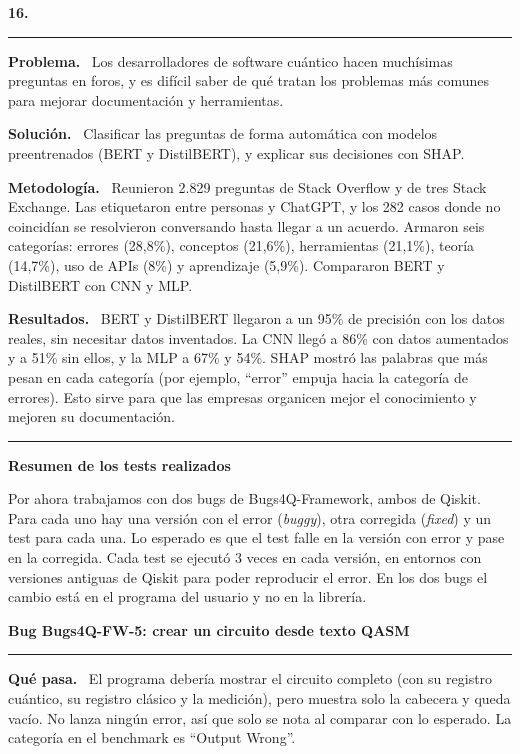 \documentclass[11pt,a4paper]{article}
\newcommand{\paper}[1]{\vspace{1.2em}\par{\large\textbf{#1}}\par\vspace{0.2em}\hrule\vspace{0.4em}}
\newcommand{\parte}[1]{\par\textbf{#1.}\ }
\begin{document}
\paper{16.}

\parte{Problema}
Los desarrolladores de software cuántico hacen muchísimas preguntas en foros, y es difícil saber de qué tratan los problemas más comunes para mejorar documentación y herramientas.

\parte{Solución}
Clasificar las preguntas de forma automática con modelos preentrenados (BERT y DistilBERT), y explicar sus decisiones con SHAP.

\parte{Metodología}
Reunieron 2.829 preguntas de Stack Overflow y de tres Stack Exchange. Las etiquetaron entre personas y ChatGPT, y los 282 casos donde no coincidían se resolvieron conversando hasta llegar a un acuerdo. Armaron seis categorías: errores (28,8\%), conceptos (21,6\%), herramientas (21,1\%), teoría (14,7\%), uso de APIs (8\%) y aprendizaje (5,9\%). Compararon BERT y DistilBERT con CNN y MLP.

\parte{Resultados}
BERT y DistilBERT llegaron a un 95\% de precisión con los datos reales, sin necesitar datos inventados. La CNN llegó a 86\% con datos aumentados y a 51\% sin ellos, y la MLP a 67\% y 54\%. SHAP mostró las palabras que más pesan en cada categoría (por ejemplo, ``error'' empuja hacia la categoría de errores). Esto sirve para que las empresas organicen mejor el conocimiento y mejoren su documentación.

\vspace{1.5em}
\hrule
\vspace{1em}

{\large\textbf{Resumen de los tests realizados}}

\vspace{0.5em}
Por ahora trabajamos con dos bugs de Bugs4Q-Framework, ambos de Qiskit. Para cada uno hay una versión con el error (\textit{buggy}), otra corregida (\textit{fixed}) y un test para cada una. Lo esperado es que el test falle en la versión con error y pase en la corregida. Cada test se ejecutó 3 veces en cada versión, en entornos con versiones antiguas de Qiskit para poder reproducir el error. En los dos bugs el cambio está en el programa del usuario y no en la librería.

\paper{Bug Bugs4Q-FW-5: crear un circuito desde texto QASM}

\parte{Qué pasa}
El programa debería mostrar el circuito completo (con su registro cuántico, su registro clásico y la medición), pero muestra solo la cabecera y queda vacío. No lanza ningún error, así que solo se nota al comparar con lo esperado. La categoría en el benchmark es ``Output Wrong''.
\end{document}
